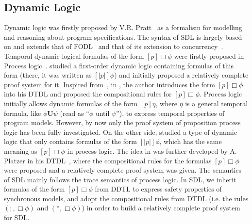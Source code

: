 \documentclass{fcs}
\newcommand{\bff}[1]{\mathbf{#1}}
\DeclareMathOperator{\seq}{;}
\begin{document}
\subsection{Dynamic Logic}
Dynamic logic was firstly proposed by V.R. Pratt~\cite{Pratt76} as a formalism for modelling and reasoning about program specifications.
The syntax of SDL is largely based on and extends that of FODL~\cite{Harel79} and that of its extension to concurrency~\cite{Peleg87}.
Temporal dynamic logical formulas of the form $[p]\Box\phi$ were firstly proposed in Process logic~\cite{Harel82}.
\cite{Beckert01} studied a first-order dynamic logic containing formulas of this form (there, it was written as $[|p|]\phi$) and initially proposed
a relatively complete proof system for it.
Inspired from~\cite{Beckert01}, in \cite{Platzer07}, the author introduces the form $[p]\Box\phi$ into his DTDL and proposed
the compositional rules for $[p]\Box\phi$.
\ifx
Process logic~\cite{???} initially allows dynamic formulas of the form $[p]\eta$, where $\eta$ is a general temporal formula, like $\phi\bff{U} \psi$ (read as ``$\phi$ until $\psi$''), to express temporal properties of program models.
However, by now only the proof system of proposition process logic has been fully investigated.
On the other side, \cite{A sequent calculus for first-order dynamic logic with trace modalities} studied a type of dynamic logic that only contains formulas of the form $[|p|]\phi$, which has the same meaning as $[p]\Box\phi$ in process logic.
The idea in \cite{A sequent calculus for first-order dynamic logic with trace modalities} was further developed by A. Platzer in his DTDL~\cite{???}, where the compositional rules for the formulas $[p]\Box\phi$ were proposed and a relatively complete proof system was given.
\fi
The semantics of SDL mainly follows the trace semantics of process logic.
In SDL, we inherit formulas of the form $[p]\Box\phi$ from DDTL to express safety properties of synchronous models, and
adopt the compositional rules from DTDL (i.e. the rules $(\seq, \Box\phi)$ and $(*, \Box\phi)$) in order to build a relatively complete proof system for SDL.
\end{document}
